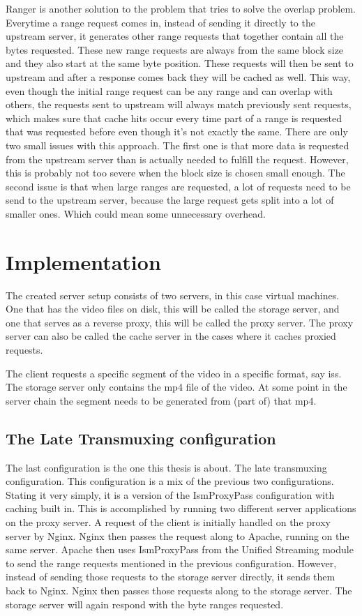 \documentclass[twoside,openright]{uva-bachelor-thesis}
\begin{document}
Ranger\autocite{ranger} is another solution to the problem that tries to solve
the overlap problem. Everytime a range request comes in, instead of sending it
directly to the upstream server, it generates other range requests that together
contain all the bytes requested. These new range requests are always from the
same block size and they also start at the same byte position. These requests
will then be sent to upstream and after a response comes back they will be
cached as well.  This way, even though the initial range request can be any
range and can overlap with others, the requests sent to upstream will always
match previously sent requests, which makes sure that cache hits occur every
time part of a range is requested that was requested before even though it's not
exactly the same. There are only two small issues with this approach. The first
one is that more data is requested from the upstream server than is actually
needed to fulfill the request. However, this is probably not too severe when the
block size is chosen small enough. The second issue is that when large ranges
are requested, a lot of requests need to be send to the upstream server, because
the large request gets split into a lot of smaller ones. Which could mean some
unnecessary overhead.





\chapter{Implementation}
The created server setup consists of two servers, in this case virtual machines.
One that has the video files on disk, this will be called the storage server,
and one that serves as a reverse proxy, this will be called the proxy server.
The proxy server can also be called the cache server in the cases where it
caches proxied requests.

The client requests a specific segment of the video in a specific format, say
\gls{iss}. The storage server only contains the mp4 file of the video. At some point
in the server chain the segment needs to be generated from (part of) that mp4.



\section{The Late Transmuxing configuration}
The last configuration is the one this thesis is about. The late transmuxing
configuration. This configuration is a mix of the previous two configurations.
Stating it very simply, it is a version of the IsmProxyPass configuration with
caching built in. This is accomplished by running two different server
applications on the proxy server. A request of the client is initially handled
on the proxy server by Nginx. Nginx then passes the request along to Apache,
running on the same server. Apache then uses IsmProxyPass from the Unified
Streaming module to send the range requests mentioned in the previous
configuration.  However, instead of sending those requests to the storage server
directly, it sends them back to Nginx. Nginx then passes those requests along to
the storage server. The storage server will again respond with the byte ranges
requested.
\end{document}
